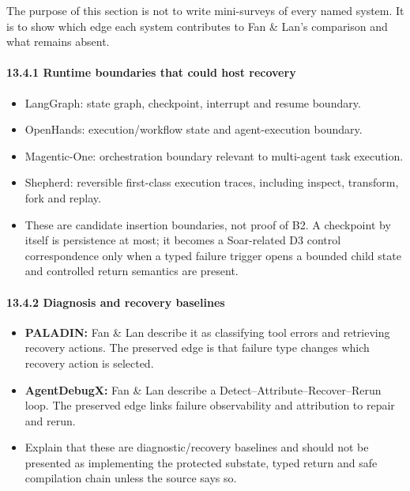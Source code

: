 The purpose of this section is not to write mini-surveys of every named system. It is to show which edge each system contributes to Fan \& Lan's comparison and what remains absent.

\paragraph{13.4.1 Runtime boundaries that could host recovery}\label{runtime-boundaries-that-could-host-recovery}

\begin{itemize}
\tightlist
\item
  LangGraph: state graph, checkpoint, interrupt and resume boundary.
\item
  OpenHands: execution/workflow state and agent-execution boundary.
\item
  Magentic-One: orchestration boundary relevant to multi-agent task execution.
\item
  Shepherd: reversible first-class execution traces, including inspect, transform, fork and replay.
\item
  These are candidate insertion boundaries, not proof of B2. A checkpoint by itself is persistence at most; it becomes a Soar-related D3 control correspondence only when a typed failure trigger opens a bounded child state and controlled return semantics are present.
\end{itemize}

\paragraph{13.4.2 Diagnosis and recovery baselines}\label{diagnosis-and-recovery-baselines}

\begin{itemize}
\tightlist
\item
  \textbf{PALADIN:} Fan \& Lan describe it as classifying tool errors and retrieving recovery actions. The preserved edge is that failure type changes which recovery action is selected.
\item
  \textbf{AgentDebugX:} Fan \& Lan describe a Detect--Attribute--Recover--Rerun loop. The preserved edge links failure observability and attribution to repair and rerun.
\item
  Explain that these are diagnostic/recovery baselines and should not be presented as implementing the protected substate, typed return and safe compilation chain unless the source says so.
\end{itemize}


